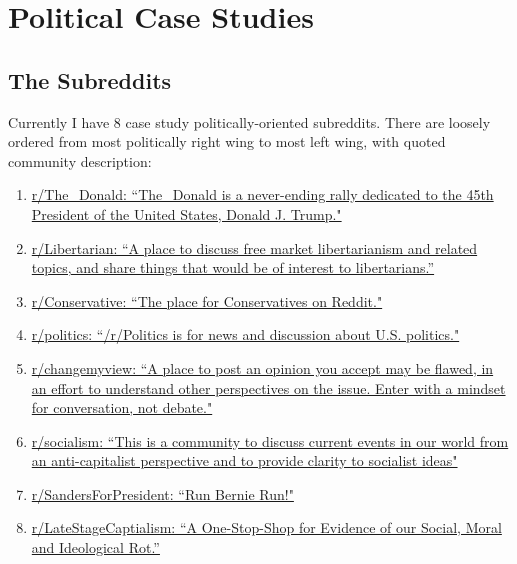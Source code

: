 \section{Political Case Studies}

\subsection{The Subreddits}
Currently I have 8 case study politically-oriented subreddits. There are loosely ordered from most politically right wing to most left wing, with quoted community description:

\begin{enumerate}
    \item \href{https://www.reddit.com/r/The_Donald}{r/The\_Donald: ``The\_Donald is a never-ending rally dedicated to the 45th President of the United States, Donald J. Trump."}
    
    \item \href{https://www.reddit.com/r/Libertarian}{r/Libertarian: ``A place to discuss free market libertarianism and related topics, and share things that would be of interest to libertarians.''}
    
    \item \href{https://www.reddit.com/r/Conservative}{r/Conservative: ``The place for Conservatives on Reddit." }
    
    \item \href{https://www.reddit.com/r/politics}{r/politics: ``/r/Politics is for news and discussion about U.S. politics."}
    
    \item \href{https://www.reddit.com/r/Conservative}{r/changemyview: ``A place to post an opinion you accept may be flawed, in an effort to understand other perspectives on the issue. Enter with a mindset for conversation, not debate."}
    
    \item \href{https://www.reddit.com/r/socialism}{r/socialism: ``This is a community to discuss current events in our world from an anti-capitalist perspective and to provide clarity to socialist ideas"}
    \item \href{https://www.reddit.com/r/SandersForPresident}{r/SandersForPresident: ``Run Bernie Run!"}
    \item \href{https://www.reddit.com/r/LateStageCapitalism}{r/LateStageCaptialism: ``A One-Stop-Shop for Evidence of our Social, Moral and Ideological Rot.''}
\end{enumerate}

